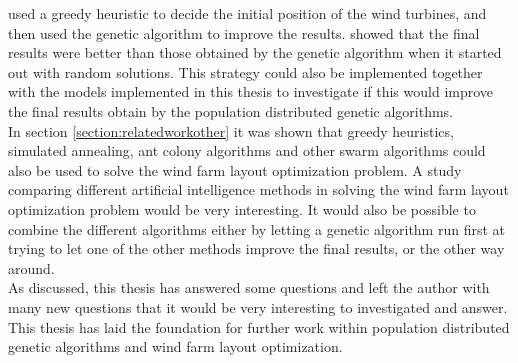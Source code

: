 \noindent \citep{Saavedra-Morena} used a greedy heuristic to decide the initial position of the wind turbines, and then used the genetic algorithm to improve the results. \citep{Saavedra-Morena} showed that the final results were better than those obtained by the genetic algorithm when it started out with random solutions. This strategy could also be implemented together with the models implemented in this thesis to investigate if this would improve the final results obtain by the population distributed genetic algorithms. \\


\noindent In section \ref{section:relatedworkother} it was shown that greedy heuristics, simulated annealing, ant colony algorithms and other swarm algorithms could also be used to solve the wind farm layout optimization problem. A study comparing different artificial intelligence methods in solving the wind farm layout optimization problem would be very interesting. It would also be possible to combine the different algorithms either by letting a genetic algorithm run first at trying to let one of the other methods improve the final results, or the other way around. \\

\noindent As discussed, this thesis has answered some questions and left the author with many new questions that it would be very interesting to investigated and answer. This thesis has laid the foundation for further work within population distributed genetic algorithms and wind farm layout optimization.\\